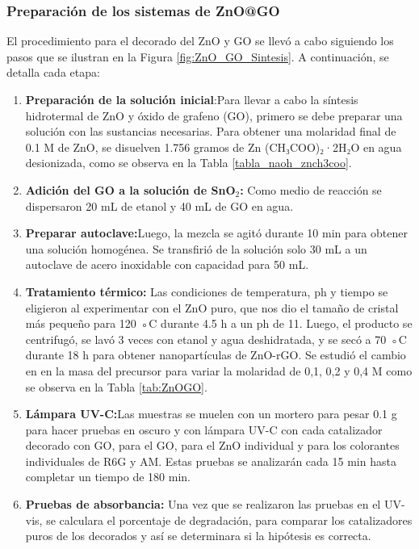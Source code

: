 \documentclass[12pt]{article}
\begin{document}
\subsubsection{Preparación de los sistemas de ZnO@GO}
    El procedimiento para el decorado del ZnO y GO se llevó a cabo siguiendo los pasos que se ilustran en la Figura \ref{fig:ZnO_GO_Sintesis}. A continuación, se detalla cada etapa:
        \begin{enumerate}
            \item \textbf{Preparación de la solución inicial}:Para llevar a cabo la síntesis hidrotermal de ZnO y óxido de grafeno (GO), primero se debe preparar una solución con las sustancias necesarias. Para obtener una molaridad final de 0.1 M de ZnO, se disuelven 1.756 gramos de Zn (CH₃COO)₂·2H₂O en agua desionizada, como se observa en la Tabla \ref{tabla_naoh_znch3coo}.
            
            \item \textbf{Adición del GO a la solución de SnO$\displaystyle _{2}$:} Como medio de reacción se dispersaron 20 mL de etanol y 40 mL de GO en agua.
            
            \item \textbf{Preparar autoclave:}Luego, la mezcla se agitó durante 10 min para obtener una solución homogénea. Se transfirió de la solución solo 30 mL a un autoclave de acero inoxidable con capacidad para 50 mL.
            
            \item \textbf{Tratamiento térmico:} Las condiciones 
            de temperatura, ph y tiempo se eligieron al experimentar con el ZnO puro, que nos dio el tamaño de cristal más pequeño para 120 ◦C durante 4.5 h a un ph de 11. Luego, el producto se centrifugó, se lavó 3 veces con etanol y agua deshidratada, y se secó a 70 ◦C durante 18 h para obtener nanopartículas de ZnO-rGO. Se estudió el cambio en en la masa del precursor para variar la molaridad de 0,1, 0,2 y 0,4 M como se observa en la Tabla \ref{tab:ZnOGO}.
             
            
            \item \textbf{Lámpara UV-C:}Las muestras se muelen con un mortero para pesar 0.1 g para hacer pruebas en oscuro y con lámpara UV-C con cada catalizador decorado con GO, para el GO, para el ZnO individual y para los colorantes individuales de R6G y AM. Estas pruebas se analizarán cada 15 min hasta completar un tiempo de 180 min. 
            \item \textbf{Pruebas de absorbancia:} Una vez que se realizaron las pruebas en el UV-vis, se calculara el porcentaje de degradación, para comparar los catalizadores puros de los decorados y así se determinara si la hipótesis es correcta.
            
         \end{enumerate}
\end{document}
